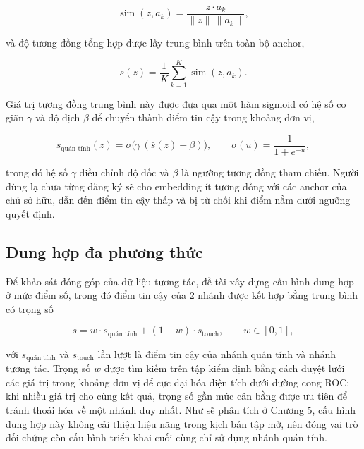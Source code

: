 \documentclass[../DoAn.tex]{subfiles}
\begin{document}
\begin{equation}
    \operatorname{sim}(z, a_k) = \frac{z \cdot a_k}{\lVert z \rVert \, \lVert a_k \rVert},
    \label{eq:cosine}
\end{equation}

và độ tương đồng tổng hợp được lấy trung bình trên toàn bộ anchor,

\begin{equation}
    \bar{s}(z) = \frac{1}{K} \sum_{k=1}^{K} \operatorname{sim}(z, a_k).
    \label{eq:cosine_mean}
\end{equation}

Giá trị tương đồng trung bình này được đưa qua một hàm sigmoid có hệ số co giãn $\gamma$ và độ dịch $\beta$ để chuyển thành điểm tin cậy trong khoảng đơn vị,

\begin{equation}
    s_\text{quán tính}(z) = \sigma\!\big(\gamma \, (\bar{s}(z) - \beta)\big),
    \qquad \sigma(u) = \frac{1}{1 + e^{-u}},
    \label{eq:sigmoid}
\end{equation}

trong đó hệ số $\gamma$ điều chỉnh độ dốc và $\beta$ là ngưỡng tương đồng tham chiếu. Người dùng lạ chưa từng đăng ký sẽ cho embedding ít tương đồng với các anchor của chủ sở hữu, dẫn đến điểm tin cậy thấp và bị từ chối khi điểm nằm dưới ngưỡng quyết định.

\subsection{Dung hợp đa phương thức}

Để khảo sát đóng góp của dữ liệu tương tác, đề tài xây dựng cấu hình dung hợp ở mức điểm số, trong đó điểm tin cậy của 2 nhánh được kết hợp bằng trung bình có trọng số

\begin{equation}
    s = w \cdot s_\text{quán tính} + (1 - w) \cdot s_\text{touch},
    \qquad w \in [0, 1],
    \label{eq:fusion}
\end{equation}

với $s_\text{quán tính}$ và $s_\text{touch}$ lần lượt là điểm tin cậy của nhánh quán tính và nhánh tương tác. Trọng số $w$ được tìm kiếm trên tập kiểm định bằng cách duyệt lưới các giá trị trong khoảng đơn vị để cực đại hóa diện tích dưới đường cong ROC; khi nhiều giá trị cho cùng kết quả, trọng số gần mức cân bằng được ưu tiên để tránh thoái hóa về một nhánh duy nhất. Như sẽ phân tích ở Chương 5, cấu hình dung hợp này không cải thiện hiệu năng trong kịch bản tập mở, nên đóng vai trò đối chứng còn cấu hình triển khai cuối cùng chỉ sử dụng nhánh quán tính.
\end{document}

